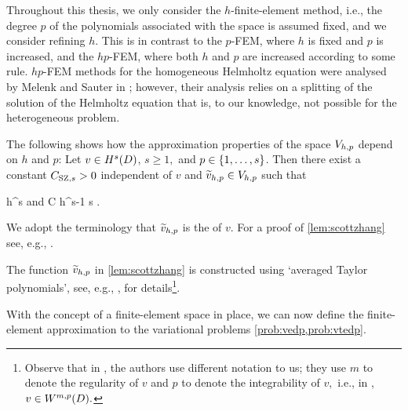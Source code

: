 Throughout this thesis, we only consider the $h$-finite-element method, i.e., the degree $p$ of the polynomials associated with the space is assumed fixed, and we consider refining $h.$ This is in contrast to the $p$-FEM, where $h$ is fixed and $p$ is increased, and the $hp$-FEM, where both $h$ and $p$ are increased according to some rule. $hp$-FEM methods for the homogeneous Helmholtz equation were analysed by Melenk and Sauter in \cite{MeSa:10,MeSa:11}; however, their analysis relies on a splitting of the solution of the Helmholtz equation that is, to our knowledge, not possible for the heterogeneous problem.

    The following  shows how the approximation properties of the space $V_{h,p}$ depend on $h$ and $p$:
    \label{lem:scottzhang}
    Let $v \in \HsD$, $s \geq 1,$ and $p \in \set{1,\ldots,s}$. Then there exist a constant $C_{\mathrm{SZ},s}>0$ independent of $v$ and $\widetilde{v}_{h,p} \in V_{h,p}$ such that

    \beqs
{} \leq \CSZs h^s 
    \eeqs
    and
    \beqs
{} \leq C h^{s-1}  \tfor s .

    \eeqs
    \ele

    We adopt the terminology that $\widetilde{v}_{h,p}$ is the  of $v.$ For a proof of \cref{lem:scottzhang} see, e.g., \cite[Corollary 4.4.24, Remark 4.4.27]{BrSc:08}.

The function $\widetilde{v}_{h,p}$ in \cref{lem:scottzhang} is constructed using `averaged Taylor polynomials', see, e.g., \cite{ScZh:90},\cite[Section 4.4]{BrSc:08} for details\footnote{Observe that in \cite{BrSc:08}, the authors use different notation to us; they use $m$ to denote the regularity of $v$ and $p$ to denote the integrability of $v,$ i.e., in \cite{BrSc:08}, $v \in \WmpD.$}.
    \ere

    With the concept of a finite-element space in place, we can now define the finite-element approximation to the variational problems \cref{prob:vedp,prob:vtedp}.

